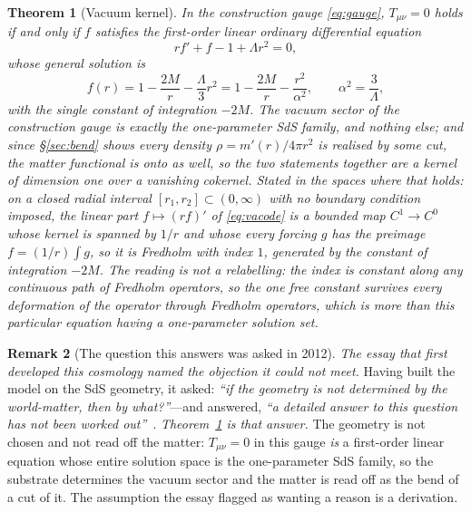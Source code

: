 \documentclass[11pt,a4paper]{article}
\newtheorem{theorem}{Theorem}
\theoremstyle{definition}
\newtheorem{remark}[theorem]{Remark}
\begin{document}
\begin{theorem}[Vacuum kernel]\label{thm:kernel}
In the construction gauge \eqref{eq:gauge}, $T_{\mu\nu}=0$ holds if and only if $f$ satisfies the first-order linear ordinary differential equation
\begin{equation}\label{eq:vacode}
r f'+f-1+\Lambda r^{2}=0,
\end{equation}
whose general solution is
\begin{equation}\label{eq:sds}
f(r)=1-\frac{2M}{r}-\frac{\Lambda}{3}r^{2}=1-\frac{2M}{r}-\frac{r^{2}}{\alpha^{2}},
\qquad \alpha^{2}=\frac{3}{\Lambda},
\end{equation}
with the single constant of integration $-2M$. The vacuum sector of the construction gauge is exactly the one-parameter SdS family, and nothing else; and since \S\ref{sec:bend} shows every density $\rho=m'(r)/4\pi r^{2}$ is realised by some cut, the matter functional is onto as well, so the two statements together are a kernel of dimension one over a vanishing cokernel. \emph{Stated in the spaces where that holds}: on a closed radial interval $[r_{1},r_{2}]\subset(0,\infty)$ with no boundary condition imposed, the linear part $f\mapsto(rf)'$ of \eqref{eq:vacode} is a bounded map $C^{1}\to C^{0}$ whose kernel is spanned by $1/r$ and whose every forcing $g$ has the preimage $f=(1/r)\int g$, so it is Fredholm with \emph{index $1$, generated by the constant of integration $-2M$}. \emph{The reading is not a relabelling}: the index is constant along any continuous path of Fredholm operators, so the one free constant survives every deformation of the operator through Fredholm operators, which is more than this particular equation having a one-parameter solution set.
\end{theorem}

\begin{remark}[The question this answers was asked in 2012]\label{rem:byWhat}
\emph{The essay that first developed this cosmology named the objection it could not meet.} Having built the model on the SdS geometry, it asked: \emph{``if the geometry is not determined by the world-matter, then by what?''}---and answered, \emph{``a detailed answer to this question has not been worked out''}~\cite{Janzen2015}. \emph{Theorem~\ref{thm:kernel} is that answer.} The geometry is not chosen and not read off the matter: $T_{\mu\nu}=0$ in this gauge \emph{is} a first-order linear equation whose entire solution space is the one-parameter SdS family, so the substrate determines the vacuum sector and the matter is read off as the bend of a cut of it. The assumption the essay flagged as wanting a reason is a derivation.
\end{remark}
\end{document}
